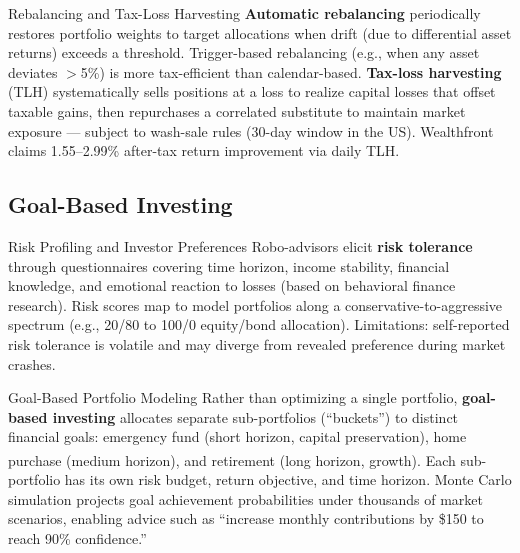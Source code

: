 \begin{v3topic}{Rebalancing and Tax-Loss Harvesting}
    \textbf{Automatic rebalancing} periodically restores portfolio weights to target allocations when drift (due to differential asset returns) exceeds a threshold.
    Trigger-based rebalancing (e.g., when any asset deviates $>$5\%) is more tax-efficient than calendar-based.
    \textbf{Tax-loss harvesting} (TLH) systematically sells positions at a loss to realize capital losses that offset taxable gains, then repurchases a correlated substitute to maintain market exposure — subject to wash-sale rules (30-day window in the US).
    Wealthfront claims 1.55--2.99\% after-tax return improvement via daily TLH.

\end{v3topic}

\subsection{Goal-Based Investing}


\begin{v3topic}{Risk Profiling and Investor Preferences}
    Robo-advisors elicit \textbf{risk tolerance} through questionnaires covering time horizon, income stability, financial knowledge, and emotional reaction to losses (based on behavioral finance research).
    Risk scores map to model portfolios along a conservative-to-aggressive spectrum (e.g., 20/80 to 100/0 equity/bond allocation).
    Limitations: self-reported risk tolerance is volatile and may diverge from revealed preference during market crashes.

\end{v3topic}
\begin{v3topic}{Goal-Based Portfolio Modeling}
    Rather than optimizing a single portfolio, \textbf{goal-based investing} allocates separate sub-portfolios (``buckets'') to distinct financial goals: emergency fund (short horizon, capital preservation), home purchase (medium horizon), and retirement (long horizon, growth)\textsuperscript{\cite[][p.~125]{jansenMachineLearningAlgorithmic2020}}.
    Each sub-portfolio has its own risk budget, return objective, and time horizon.
    Monte Carlo simulation projects goal achievement probabilities under thousands of market scenarios, enabling advice such as ``increase monthly contributions by \$150 to reach 90\% confidence.''

\end{v3topic}

